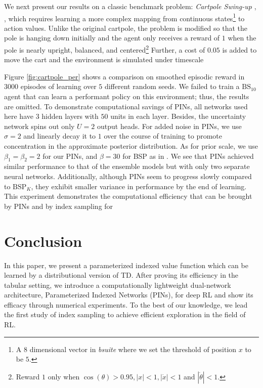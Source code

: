 \documentclass[letterpaper]{article} %
\newcommand{\abs}[1]{\left|#1\right|}
\theoremstyle{definition}
\begin{document}
We next present our results on a classic benchmark problem: \textit{Cartpole Swing-up} \cite{sutton2018reinforcement}, \cite{osband2019bsuite}, which requires learning a more complex mapping from continuous states\footnote{A $8$ dimensional vector in \textit{bsuite} where we set the threshold of position $x$ to be $5$.} to action values. Unlike the original cartpole, the problem is modified so that the pole is hanging down initially and the agent only receives a reward of $1$ when the pole is nearly upright, balanced, and centered\footnote{Reward $1$ only when $\cos(\theta) > 0.95, \abs{x} < 1, \abs{\Dot{x}} < 1$ and $|\Dot{\theta}| < 1$.} Further, a cost of $0.05$ is added to move the cart and the environment is simulated under timescale

Figure \ref{fig:cartpole_per} shows a comparison on smoothed episodic reward in $3000$ episodes of learning over $5$ different random seeds. We failed to train a $\mathrm{BS}_{10}$ agent that can learn a performant policy on this environment; thus, the results are omitted. To demonstrate computational savings of PINs, all networks used here have $3$ hidden layers with $50$ units in each layer. Besides, the uncertainty network spins out only $U=2$ output heads. For added noise in PINs, we use $\sigma=2$ and linearly decay it to $1$ over the course of training to promote concentration in the approximate posterior distribution. As for prior scale, we use $\beta_1=\beta_2=2$ for our PINs, and $\beta=30$ for BSP as in \cite{osband2018randomized}. We see that PINs achieved similar performance to that of the ensemble models but with only two separate neural networks. Additionally, although PINs seem to progress slowly compared to $\mathrm{BSP}_K$, they exhibit smaller variance in performance by the end of learning. This experiment demonstrates the computational efficiency that can be brought by PINs and by index sampling for

\section{Conclusion}

In this paper, we present a parameterized indexed value function which can be learned by a distributional version of TD. After proving its efficiency in the tabular setting, we introduce a computationally lightweight dual-network architecture, Parameterized Indexed Networks (PINs), for deep RL and show its efficacy through numerical experiments. To the best of our knowledge, we lead the first study of index sampling to achieve efficient exploration in the field of RL.
\end{document}
